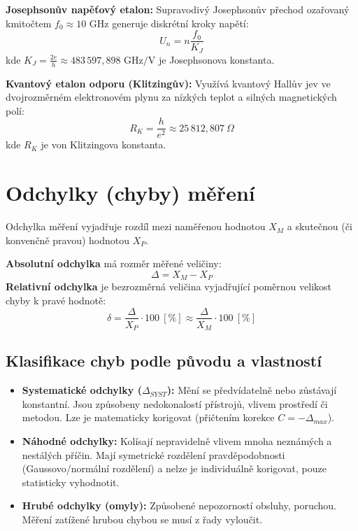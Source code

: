 \noindent\textbf{Josephsonův napěťový etalon:} Supravodivý Josephsonův přechod ozařovaný kmitočtem $f_0 \approx 10\text{ GHz}$ generuje diskrétní kroky napětí:
\[ U_n = n \frac{f_0}{K_J} \]
kde $K_J = \frac{2e}{h} \approx 483\,597{,}898\text{ GHz/V}$ je Josephsonova konstanta.

\noindent\textbf{Kvantový etalon odporu (Klitzingův):} Využívá kvantový Hallův jev ve dvojrozměrném elektronovém plynu za nízkých teplot a silných magnetických polí:
\[ R_K = \frac{h}{e^2} \approx 25\,812{,}807\ \Omega \]
kde $R_K$ je von Klitzingova konstanta.

\section{Odchylky (chyby) měření}
Odchylka měření vyjadřuje rozdíl mezi naměřenou hodnotou $X_M$ a skutečnou (či konvenčně pravou) hodnotou $X_P$.

\noindent\textbf{Absolutní odchylka} má rozměr měřené veličiny:
\[ \Delta = X_M - X_P \]
\textbf{Relativní odchylka} je bezrozměrná veličina vyjadřující poměrnou velikost chyby k pravé hodnotě:
\[ \delta = \frac{\Delta}{X_P} \cdot 100\ [\%] \approx \frac{\Delta}{X_M} \cdot 100\ [\%] \]

\subsection{Klasifikace chyb podle původu a vlastností}
\begin{itemize}
    \item \textbf{Systematické odchylky ($\Delta_{SYST}$):} Mění se předvídatelně nebo zůstávají konstantní. Jsou způsobeny nedokonalostí přístrojů, vlivem prostředí či metodou. Lze je matematicky korigovat (přičtením korekce $C = -\Delta_{max}$).
    \item \textbf{Náhodné odchylky:} Kolísají nepravidelně vlivem mnoha neznámých a nestálých příčin. Mají symetrické rozdělení pravděpodobnosti (Gaussovo/normální rozdělení) a nelze je individuálně korigovat, pouze statisticky vyhodnotit.
    \item \textbf{Hrubé odchylky (omyly):} Způsobené nepozorností obsluhy, poruchou. Měření zatížené hrubou chybou se musí z řady vyloučit.
\end{itemize}

